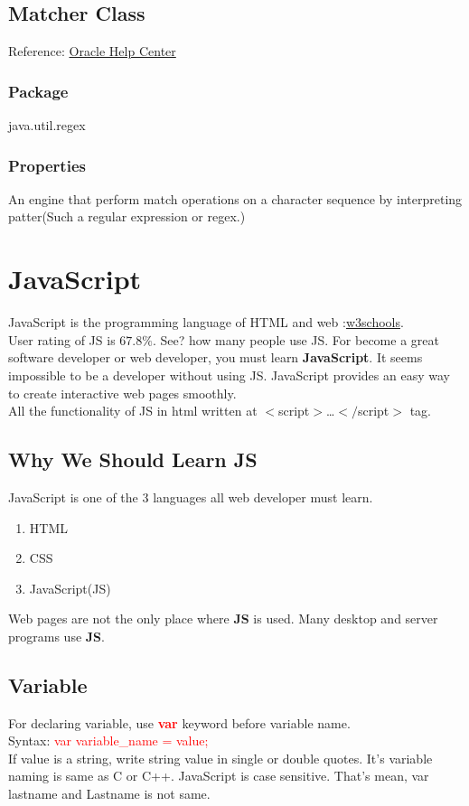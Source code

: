 \documentclass[11 pt]{book}
\begin{document}
\section{Matcher Class}
Reference: \href{https://docs.oracle.com/javase/7/docs/api/java/util/regex/Matcher.html}{Oracle Help Center}\hfill

\subsection{Package}
java.util.regex
\subsection{Properties}
An engine that perform match operations on a character sequence by interpreting patter(Such a regular expression or regex.)

\chapter{JavaScript}
JavaScript is the programming language of HTML and web :\href{https://www.w3schools.com/js/}{w3schools}.\\
User rating of JS is $67.8\%$. See? how many people use JS. For become a great software developer or web developer, you must learn \textbf{JavaScript}. It seems impossible to be a developer without using JS. JavaScript provides an easy way to create interactive web pages smoothly.\\
All the functionality of JS in html written at $<$script$>$\dots$</$script$>$ tag.
\section{Why We Should Learn JS}
JavaScript is one of the 3 languages all web developer must learn.\\
\begin{enumerate}
 \item HTML
 \item CSS
 \item JavaScript(JS)
\end{enumerate}
Web pages are not the only place where \textbf{JS} is used. Many desktop and server programs use \textbf{JS}.
\section{Variable}
For declaring variable, use \textbf{\textcolor{red}{var}} keyword before variable name.\\
Syntax: \textcolor{red}{var variable\_name = value;}\\
If value is a string, write string value in single or double quotes. It's variable naming is same as C or C++. JavaScript is case sensitive. That's mean, var lastname and Lastname is not same.
\end{document}
